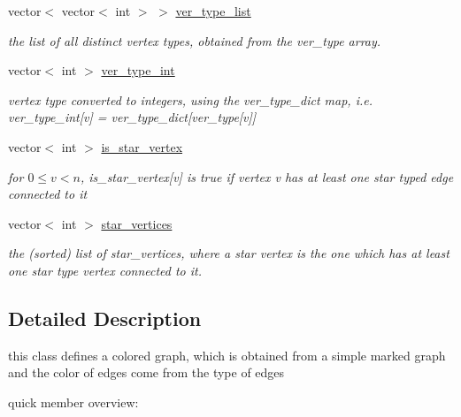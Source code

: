 \begin{DoxyCompactItemize}
vector$<$ vector$<$ int $>$ $>$ \hyperlink{classcolored__graph_a3a1ae8abac458d20a2afb4aa48bbc956}{ver\+\_\+type\+\_\+list}
\begin{DoxyCompactList}\small\item\em the list of all distinct vertex types, obtained from the ver\+\_\+type array. \end{DoxyCompactList}\item 
vector$<$ int $>$ \hyperlink{classcolored__graph_a491ed2ea1a65118af02ec606c8d44c0a}{ver\+\_\+type\+\_\+int}
\begin{DoxyCompactList}\small\item\em vertex type converted to integers, using the ver\+\_\+type\+\_\+dict map, i.\+e. ver\+\_\+type\+\_\+int\mbox{[}v\mbox{]} = ver\+\_\+type\+\_\+dict\mbox{[}ver\+\_\+type\mbox{[}v\mbox{]}\mbox{]} \end{DoxyCompactList}\item 
vector$<$ int $>$ \hyperlink{classcolored__graph_a00d0c64fcf8de58553aa4cade64193df}{is\+\_\+star\+\_\+vertex}
\begin{DoxyCompactList}\small\item\em for $0 \leq v < n$, is\+\_\+star\+\_\+vertex\mbox{[}v\mbox{]} is true if vertex v has at least one star typed edge connected to it \end{DoxyCompactList}\item 
vector$<$ int $>$ \hyperlink{classcolored__graph_ab7ee8d717abde7ad7467ef695038f574}{star\+\_\+vertices}
\begin{DoxyCompactList}\small\item\em the (sorted) list of star\+\_\+vertices, where a star vertex is the one which has at least one star type vertex connected to it. \end{DoxyCompactList}\end{DoxyCompactItemize}


\subsection{Detailed Description}
this class defines a colored graph, which is obtained from a simple marked graph and the color of edges come from the type of edges 

quick member overview\+:


